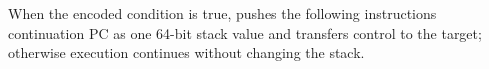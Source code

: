When the encoded condition is true, pushes the following instruction\textquotesingle{}s continuation PC as one 64-bit stack value and transfers control to the target; otherwise execution continues without changing the stack.
